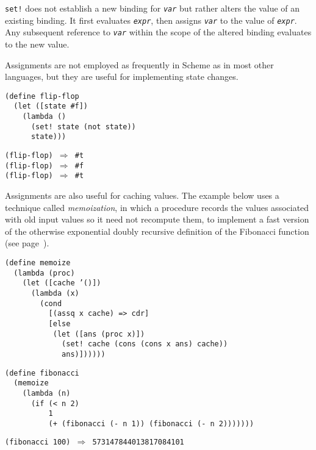 \label{binding_s29}\texttt{set!} does not establish a new binding for
\texttt{\textit{var}} but rather alters the value of an existing binding.
\label{binding_s30}It first evaluates \texttt{\textit{expr}}, then assigns
\texttt{\textit{var}} to the value of \texttt{\textit{expr}}.
Any subsequent reference to \texttt{\textit{var}} within the scope of the altered
binding evaluates to the new value.


Assignments are not employed as frequently in Scheme as in most other
languages, but they are useful for implementing state changes.\label{binding_s31}


\begin{alltt}
(define flip-flop
  (let ([state \#{}f])
    (lambda ()
      (set! state (not state))
      state)))

(flip-flop) \(\Rightarrow\) \#{}t
(flip-flop) \(\Rightarrow\) \#{}f
(flip-flop) \(\Rightarrow\) \#{}t
\end{alltt}


Assignments are also useful for caching values.
The example below uses a technique called \textit{memoization},
in which a procedure records the values associated with old
input values so it need not recompute them, to implement a fast
version of the otherwise exponential doubly recursive definition
of the \label{binding_s32}Fibonacci function (see
page \pageref{further_fibonacci}).\label{binding_s33}


\begin{alltt}
(define memoize
  (lambda (proc)
    (let ([cache '()])
      (lambda (x)
        (cond
          [(assq x cache) =\textgreater{} cdr]
          [else
           (let ([ans (proc x)])
             (set! cache (cons (cons x ans) cache))
             ans)])))))

(define fibonacci
  (memoize
    (lambda (n)
      (if (\textless{} n 2)
          1
          (+ (fibonacci (- n 1)) (fibonacci (- n 2)))))))

(fibonacci 100) \(\Rightarrow\) 573147844013817084101
\end{alltt}



